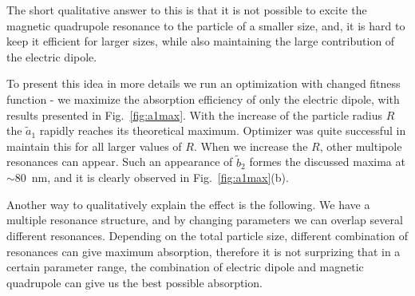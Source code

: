 \documentclass[a4paper]{article}
\begin{document}
The short qualitative answer to this is that it is not possible to
excite the magnetic quadrupole resonance to the particle of a smaller
size, and, it is hard to keep it efficient for larger sizes, while
also maintaining the large contribution of the electric dipole.

To present this idea in more details we run an optimization with
changed fitness function - we maximize the absorption efficiency of
only the electric dipole, with results presented in
Fig.~\ref{fig:a1max}. With the increase of the particle radius $R$ the
$\tilde{a}_1$ rapidly reaches its theoretical maximum. Optimizer was
quite successful in maintain this for all larger values of $R$. When
we increase the $R$, other multipole resonances can appear. Such an
appearance of $\tilde{b}_2$ formes the discussed maxima at $\sim
80$~nm, and it is clearly observed in Fig.~\ref{fig:a1max}(b).

Another way to qualitatively explain the effect is the following. We
have a multiple resonance structure, and by changing parameters we can
overlap several different resonances. Depending on the total particle
size, different combination of resonances can give maximum absorption,
therefore it is not surprizing that in a certain parameter range, the
combination of electric dipole and magnetic quadrupole can give us the
best possible absorption.
\end{document}
